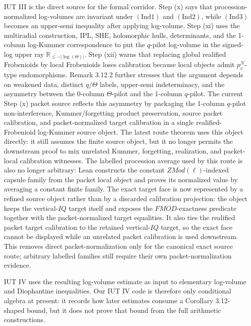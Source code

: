 \documentclass[11pt]{article}
\newcommand{\IUT}{IUT}
\newcommand{\R}{\mathbb{R}}
\newcommand{\Ind}{\ensuremath{\mathrm{Ind}}}
\newcommand{\SHE}{\ensuremath{\mathrm{SHE}}}
\newcommand{\IPL}{\ensuremath{\mathrm{IPL}}}
\theoremstyle{plain}
\theoremstyle{definition}
\theoremstyle{remark}
\begin{document}
\IUT{} III is the direct source for the formal corridor.  Step (x) says that
procession-normalized log-volumes are invariant under \((\Ind1)\) and
\((\Ind2)\), while \((\Ind3)\) becomes an upper-semi inequality after applying
log-volume.  Step (xi) uses the multiradial construction, \(\IPL\), \(\SHE\),
holomorphic hulls, determinants, and the 1-column log-Kummer correspondence to
put the \(q\)-pilot log-volume in the signed-log upper ray
\(\R_{\le -|\log(\Theta)|}\).  Step (xii) warns that replacing global
realified Frobenioids by local Frobenioids loses calibration because local
objects admit \(p_v^N\)-type endomorphisms.  Remark 3.12.2 further stresses
that the argument depends on weakened data, distinct \(q/\Theta\) labels,
upper-semi indeterminacy, and the asymmetry between the 0-column
\(\Theta\)-pilot and the 1-column \(q\)-pilot.
The current Step (x) packet source reflects this asymmetry by packaging the
1-column \(q\)-pilot non-interference, Kummer/forgetting product preservation,
source packet calibration, and packet-normalized target calibration in a single
realified-Frobenioid log-Kummer source object.
The latest route theorem uses this object directly: it still assumes the finite
source object, but it no longer permits the downstream proof to mix unrelated
Kummer, forgetting, realization, and packet-local calibration witnesses.
The labelled procession average used by this route is also no longer arbitrary:
Lean constructs the constant \(ZMod(\ell)\)-indexed capsule family from the
packet local object and proves its normalized value by averaging a constant
finite family.
The exact target face is now represented by a refined source object rather than
by a discarded calibration projection: the object keeps the vertical-\(IQ\)
target itself and exposes the \(FMOD\)-exactness predicate together with the
packet-normalized target equalities.
It also ties the realified packet target calibration to the retained
vertical-\(IQ\) target, so the exact face cannot be displayed while an
unrelated packet calibration is used downstream.
This removes direct packet-normalization only for the canonical exact source
route; arbitrary labelled families still require their own
packet-normalization evidence.

\IUT{} IV uses the resulting log-volume estimate as input to elementary
log-volume and Diophantine inequalities.  Our \IUT{} IV code is therefore only
conditional algebra at present: it records how later estimates consume a
Corollary 3.12-shaped bound, but it does not prove that bound from the full
arithmetic constructions.
\end{document}
